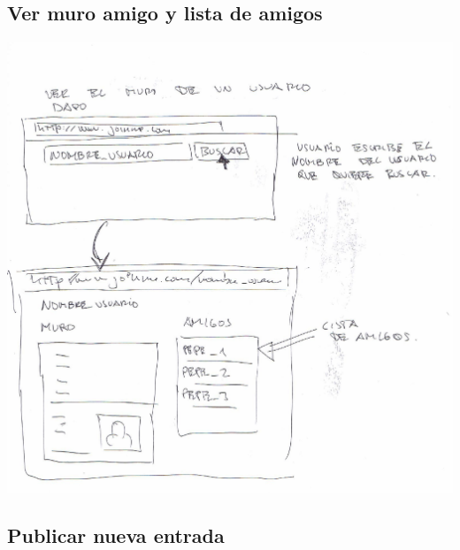 \documentclass[12pt, a4paper, titlepage]{article}
\begin{document}
\subsection{Ver muro amigo y lista de amigos}


	\begin{center}
		\includegraphics[scale=0.5]{Imagenes/ver_muro_amigo}
	\end{center}


\subsection{Publicar nueva entrada}
\end{document}

